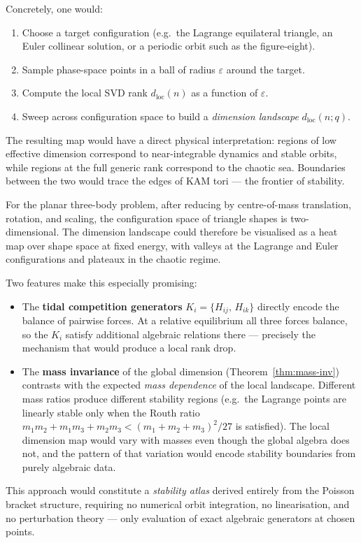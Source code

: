 \documentclass[11pt,a4paper]{article}
\theoremstyle{remark}
\newcommand{\pb}[2]{\{#1,\,#2\}}
\begin{document}
\begin{enumerate}
    Concretely, one would:
    \begin{enumerate}[nosep,label=(\alph*)]
      \item Choose a target configuration (e.g.\ the Lagrange
        equilateral triangle, an Euler collinear solution, or a
        periodic orbit such as the figure-eight).
      \item Sample phase-space points in a ball of radius
        $\varepsilon$ around the target.
      \item Compute the local SVD rank $d_{\mathrm{loc}}(n)$ as a
        function of $\varepsilon$.
      \item Sweep across configuration space to build a
        \emph{dimension landscape} $d_{\mathrm{loc}}(n; q)$.
    \end{enumerate}

    The resulting map would have a direct physical interpretation:
    regions of low effective dimension correspond to near-integrable
    dynamics and stable orbits, while regions at the full generic
    rank correspond to the chaotic sea.  Boundaries between the two
    would trace the edges of KAM tori --- the frontier of stability.

    For the planar three-body problem, after reducing by
    centre-of-mass translation, rotation, and scaling, the
    configuration space of triangle shapes is two-dimensional.  The
    dimension landscape could therefore be visualised as a heat map
    over shape space at fixed energy, with valleys at the Lagrange
    and Euler configurations and plateaux in the chaotic regime.

    Two features make this especially promising:
    \begin{itemize}[nosep]
      \item The \textbf{tidal competition generators} $K_i =
        \pb{H_{ij}}{H_{ik}}$ directly encode the balance of
        pairwise forces.  At a relative equilibrium all three
        forces balance, so the $K_i$ satisfy additional algebraic
        relations there --- precisely the mechanism that would
        produce a local rank drop.
      \item The \textbf{mass invariance} of the global dimension
        (Theorem~\ref{thm:mass-inv}) contrasts with the expected
        \emph{mass dependence} of the local landscape.  Different
        mass ratios produce different stability regions (e.g.\
        the Lagrange points are linearly stable only when the
        Routh ratio $m_1 m_2 + m_1 m_3 + m_2 m_3 < (m_1+m_2+m_3)^2/27$
        is satisfied).  The local dimension map would vary with
        masses even though the global algebra does not, and the
        pattern of that variation would encode stability boundaries
        from purely algebraic data.
    \end{itemize}

    This approach would constitute a \emph{stability atlas} derived
    entirely from the Poisson bracket structure, requiring no
    numerical orbit integration, no linearisation, and no
    perturbation theory --- only evaluation of exact algebraic
    generators at chosen points.
\end{enumerate}
\end{document}
